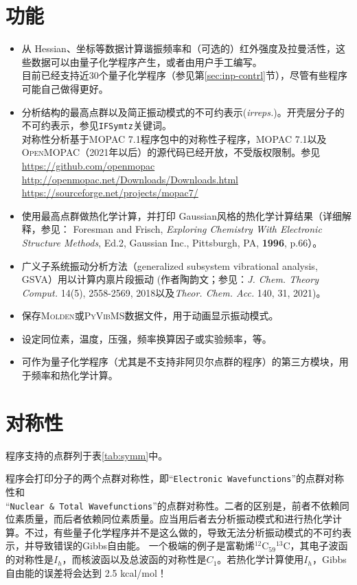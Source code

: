 \documentclass[12pt,a4paper,openany,twoside,cap,UTF8]{ctexbook}
\begin{document}
\section{功能} \label{sec:feature}

\begin{itemize}
\item 从 Hessian、坐标等数据计算谐振频率和（可选的）红外强度及拉曼活性，这些数据可以由量子化学程序产生，或者由用户手工编写。 \\
目前已经支持近30个量子化学程序（参见第\ref{sec:inp-contrl}节），尽管有些程序可能自己做得更好。
\item 分析结构的最高点群以及简正振动模式的不可约表示(\emph{irreps.})。开壳层分子的不可约表示，参见\verb|IFSymtz|关键词。 \\
对称性分析基于\textsc{MOPAC} 7.1程序包中的对称性子程序，\textsc{MOPAC} 7.1以及\textsc{OpenMOPAC}（2021年以后）的源代码已经开放，不受版权限制。参见 \\
\url{https://github.com/openmopac} \\
\url{http://openmopac.net/Downloads/Downloads.html} \\
\url{https://sourceforge.net/projects/mopac7/}
\item 使用最高点群做热化学计算，并打印 Gaussian风格的热化学计算结果（详细解释，参见： Foresman and Frisch, \emph{Exploring Chemistry With Electronic Structure Methods}, Ed.2, Gaussian Inc., Pittsburgh, PA, \textbf{1996}, p.66）。
\item 广义子系统振动分析方法（generalized subsystem vibrational analysis, GSVA）用以计算内禀片段振动 (作者陶韵文；参见：\textit{J. Chem. Theory Comput.} 14(5), 2558-2569, 2018以及\textit{Theor. Chem. Acc.} 140, 31, 2021)。
\item 保存\textsc{Molden}或\textsc{PyVibMS}数据文件，用于动画显示振动模式。
\item 设定同位素，温度，压强，频率换算因子或实验频率，等。
\item 可作为量子化学程序（尤其是不支持非阿贝尔点群的程序）的第三方模块，用于频率和热化学计算。
\end{itemize}

\section{对称性} \label{sec:symm}

程序支持的点群列于表\ref{tab:symm}中。

程序会打印分子的两个点群对称性，即``\verb|Electronic Wavefunctions|''的点群对称性和 \\
``\verb|Nuclear & Total Wavefunctions|''的点群对称性。二者的区别是，前者不依赖同位素质量，而后者依赖同位素质量。应当用后者去分析振动模式和进行热化学计算。不过，有些量子化学程序并不是这么做的，导致无法分析振动模式的不可约表示，并导致错误的Gibbs自由能。
一个极端的例子是富勒烯$^{12}$C$_{59}{}^{13}$C，其电子波函的对称性是$I_h$，而核波函以及总波函的对称性是$C_1$。若热化学计算使用$I_h$，Gibbs自由能的误差将会达到 2.5 kcal/mol！
\end{document}
